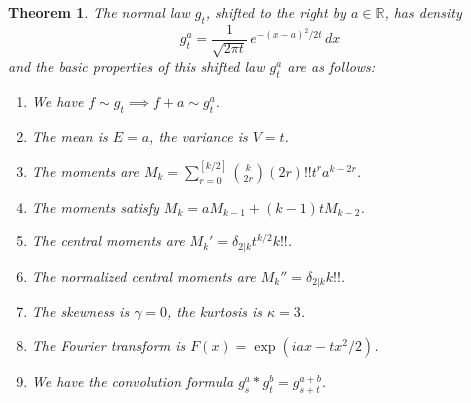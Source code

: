 \documentclass[12pt]{amsbook}
\newtheorem{theorem}{Theorem}[chapter]
\begin{document}
\begin{theorem}
The normal law $g_t$, shifted to the right by $a\in\mathbb R$, has density
$$g_t^a=\frac{1}{\sqrt{2\pi t}}\,e^{-(x-a)^2/2t}\,dx$$
and the basic properties of this shifted law $g_t^a$ are as follows:
\begin{enumerate}
\item We have $f\sim g_t\implies f+a\sim g_t^a$.

\item The mean is $E=a$, the variance is $V=t$.

\item The moments are $M_k=\sum_{r=0}^{[k/2]}\binom{k}{2r}(2r)!!t^ra^{k-2r}$.

\item The moments satisfy $M_k=aM_{k-1}+(k-1)tM_{k-2}$.

\item The central moments are $M_k'=\delta_{2|k}t^{k/2}k!!$.

\item The normalized central moments are $M_k''=\delta_{2|k}k!!$.

\item The skewness is $\gamma=0$, the kurtosis is $\kappa=3$.

\item The Fourier transform is $F(x)=\exp(iax-tx^2/2)$.

\item We have the convolution formula $g_s^a*g_t^b=g_{s+t}^{a+b}$.
\end{enumerate}
\end{theorem}
\end{document}
